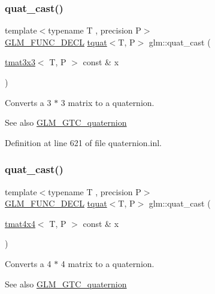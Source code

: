 \subsubsection{\texorpdfstring{quat\_cast()}{quat\_cast()}\hspace{0.1cm}{\footnotesize\ttfamily [1/2]}}
{\footnotesize\ttfamily template$<$typename T , precision P$>$ \\
\mbox{\hyperlink{setup_8hpp_ab2d052de21a70539923e9bcbf6e83a51}{G\+L\+M\+\_\+\+F\+U\+N\+C\+\_\+\+D\+E\+CL}} \mbox{\hyperlink{structglm_1_1tquat}{tquat}}$<$T, P$>$ glm\+::quat\+\_\+cast (\begin{DoxyParamCaption}\item[{\mbox{\hyperlink{structglm_1_1tmat3x3}{tmat3x3}}$<$ T, P $>$ const \&}]{x }\end{DoxyParamCaption})}

Converts a 3 $\ast$ 3 matrix to a quaternion.

\begin{DoxySeeAlso}{See also}
\mbox{\hyperlink{group__gtc__quaternion}{G\+L\+M\+\_\+\+G\+T\+C\+\_\+quaternion}} 
\end{DoxySeeAlso}


Definition at line 621 of file quaternion.\+inl.

\mbox{\label{group__gtc__quaternion_ga3e4615e9884dd0f41f5617b9848a5d9c}} 
\subsubsection{\texorpdfstring{quat\_cast()}{quat\_cast()}\hspace{0.1cm}{\footnotesize\ttfamily [2/2]}}
{\footnotesize\ttfamily template$<$typename T , precision P$>$ \\
\mbox{\hyperlink{setup_8hpp_ab2d052de21a70539923e9bcbf6e83a51}{G\+L\+M\+\_\+\+F\+U\+N\+C\+\_\+\+D\+E\+CL}} \mbox{\hyperlink{structglm_1_1tquat}{tquat}}$<$T, P$>$ glm\+::quat\+\_\+cast (\begin{DoxyParamCaption}\item[{\mbox{\hyperlink{structglm_1_1tmat4x4}{tmat4x4}}$<$ T, P $>$ const \&}]{x }\end{DoxyParamCaption})}

Converts a 4 $\ast$ 4 matrix to a quaternion.

\begin{DoxySeeAlso}{See also}
\mbox{\hyperlink{group__gtc__quaternion}{G\+L\+M\+\_\+\+G\+T\+C\+\_\+quaternion}} 
\end{DoxySeeAlso}


